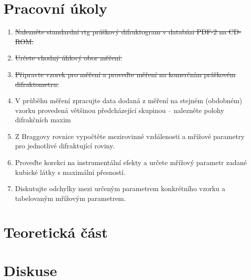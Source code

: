 \documentclass[10pt,a4paper]{article}
\newcommand{\°}{\degree}
\begin{document}

\setmainfont{Linux Libertine O}




\section{Pracovní úkoly}
\begin{enumerate}

    \item \st{Nalezněte standardní rtg práškový difraktogram v databázi PDF-2 na CD-ROM.}
    \item \st{Určete vhodný úhlový obor měření.}
    \item \st{Připravte vzorek pro měření a proveďte měření na komerčním práškovém difraktometru.}
    \item V průběhu měření zpracujte data dodaná z měření na stejném (obdobném) vzorku provedená většinou předcházející skupinou – nalezněte polohy difrakčních maxim
    \item Z Braggovy rovnice vypočtěte mezirovinné vzdálenosti a mřížové parametry pro jednotlivé difraktující roviny.
    \item Proveďte korekci na instrumentální efekty a určete mřížový parametr zadané kubické látky s maximální přesností.
    \item Diskutujte odchylky mezi určeným parametrem konkrétního vzorku a tabelovaným mřížovým parametrem.

\end{enumerate}

\section{Teoretická část}

\begin{figure}[p]
    \centering
    \caption{}
    \label{}
\end{figure}

\section{Diskuse}
\end{document}
